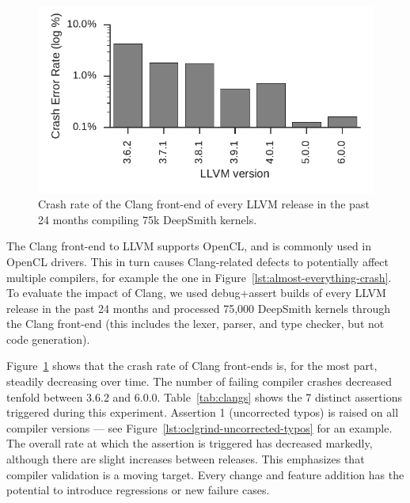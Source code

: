 \begin{figure}
  \centering %
  \includegraphics[width=.95\columnwidth]{build/img/clang-crashes}%
  \caption{%
    Crash rate of the Clang front-end of every LLVM release in the past 24 months compiling 75k DeepSmith kernels.
  }%
  \label{fig:clangs} %
\end{figure}

%   

\begin{table}
  \scriptsize %
  \centering %
  
  \caption{%
    The number of DeepSmith programs which trigger distinct Clang front-end assertions, and the number of programs which trigger unreachables.%
  }
  \label{tab:clangs}
\end{table}

The Clang front-end to LLVM supports OpenCL, and is commonly used in OpenCL drivers. This in turn causes Clang-related defects to potentially affect multiple compilers, for example the one in Figure~\ref{lst:almost-everything-crash}. To evaluate the impact of Clang, we used debug+assert builds of every LLVM release in the past 24 months and processed 75,000 DeepSmith kernels through the Clang front-end (this includes the lexer, parser, and type checker, but not code generation).

Figure~\ref{fig:clangs} shows that the crash rate of Clang front-ends is, for the most part, steadily decreasing over time. The number of failing compiler crashes decreased tenfold between 3.6.2 and 6.0.0.
Table~\ref{tab:clangs} shows the 7 distinct assertions triggered during this experiment. Assertion 1 (uncorrected typos) is raised on all compiler versions --- see Figure~\ref{lst:oclgrind-uncorrected-typos} for an example. The overall rate at which the assertion is triggered has decreased markedly, although there are slight increases between releases. This emphasizes that compiler validation is a moving target. Every change and feature addition has the potential to introduce regressions or new failure cases.

